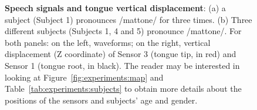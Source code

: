 \begin{figure}
  \centering
	

	\caption[Speech signals and tongue vertical displacement]
	{\textbf{Speech signals and tongue vertical displacement}: (a) a subject
	(Subject 1) pronounces /mattone/ for three times. 
	(b) Three different subjects (Subjects 1, 4 and 5) pronounce /mattone/.
	For both panels: on the left, waveforms; on the right, vertical
	displacement (Z coordinate) of Sensor 3 (tongue tip, in red) and Sensor 1
	(tongue root, in black).
	The reader may be interested in looking at Figure~\ref{fig:experiments:map}
	and Table~\ref{tab:experiments:subjects} to obtain more details about 
	the positions of the sensors and subjects' age and gender.}
	\label{fig:conclusions:end}
\end{figure}
